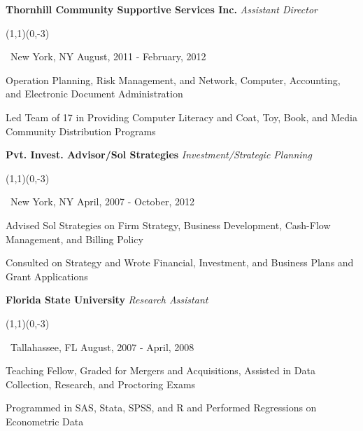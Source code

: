 \documentclass[letterpaper,10pt]{article}
\newcommand{\sbullet}{\,\begin{picture}(1,1)(0,-3)\circle*{3}\end{picture}\ }
\begin{document}
\vspace{-1mm}
{\addtolength{\leftskip}{0mm} \textbf{Thornhill Community Supportive Services Inc.} \emph{Assistant Director} 
\sbullet New York, NY \hfill{} August, 2011 - February, 2012

\vspace{-2mm} {\addtolength{\leftskip}{0mm}
\begin{itemize}\setlength{\itemsep}{0cm}\setlength{\parskip}{0cm} {\addtolength{\leftskip}{-5mm}
  \item Operation Planning, Risk Management, and Network, Computer, Accounting, and Electronic Document Administration
  \item Led Team of 17 in Providing Computer Literacy and Coat, Toy, Book, and Media Community Distribution Programs

}
\end{itemize}

}}

\vspace{-1mm}
{\addtolength{\leftskip}{0mm} \textbf{Pvt. Invest. Advisor/Sol Strategies} \emph{Investment/Strategic Planning} 
\sbullet New York, NY \hfill{} April, 2007 - October, 2012

\vspace{-2mm} {\addtolength{\leftskip}{0mm}
\begin{itemize}\setlength{\itemsep}{0cm}\setlength{\parskip}{0cm} {\addtolength{\leftskip}{-5mm}
  \item Advised Sol Strategies on Firm Strategy, Business Development, Cash-Flow Management, and Billing Policy
  \item Consulted on Strategy and Wrote Financial, Investment, and Business Plans and Grant Applications

}
\end{itemize}

}}

\vspace{-1mm}
{\addtolength{\leftskip}{0mm} \textbf{Florida State University} \emph{Research Assistant} 
\sbullet Tallahassee, FL \hfill{} August, 2007 - April, 2008

\vspace{-2mm} {\addtolength{\leftskip}{0mm}
\begin{itemize}\setlength{\itemsep}{0cm}\setlength{\parskip}{0cm} {\addtolength{\leftskip}{-5mm}
  \item Teaching Fellow, Graded for Mergers and Acquisitions, Assisted in Data Collection, Research, and Proctoring Exams
  \item Programmed in SAS, Stata, SPSS, and R and Performed Regressions on Econometric Data

}
\end{itemize}

}}
\end{document}
